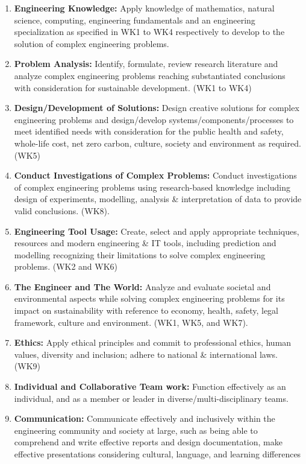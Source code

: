 \vspace{0.05cm}
\noindent
\fontsize{10pt}{24pt}\selectfont 
\begin{enumerate}
    \item \textbf{Engineering Knowledge:} Apply knowledge of mathematics, natural science, computing, engineering fundamentals and an engineering specialization as specified in WK1 to WK4 respectively to develop to the solution of complex engineering problems.
    \item \textbf{Problem Analysis:} Identify, formulate, review research literature and analyze complex engineering problems reaching substantiated conclusions with consideration for sustainable development. (WK1 to WK4)
    \item \textbf{Design/Development of Solutions:} Design creative solutions for complex engineering problems and design/develop systems/components/processes to meet identified needs with consideration for the public health and safety, whole-life cost, net zero carbon, culture, society and environment as required. (WK5)
    \item \textbf{Conduct Investigations of Complex Problems:} Conduct investigations of complex engineering problems using research-based knowledge including design of experiments, modelling, analysis \& interpretation of data to provide valid conclusions. (WK8).
    \item \textbf{Engineering Tool Usage:} Create, select and apply appropriate techniques, resources and modern engineering \& IT tools, including prediction and modelling recognizing their limitations to solve complex engineering problems. (WK2 and WK6)
    \item \textbf{The Engineer and The World:} Analyze and evaluate societal and environmental aspects while solving complex engineering problems for its impact on sustainability with reference to economy, health, safety, legal framework, culture and environment. (WK1, WK5, and WK7).
    \item \textbf{Ethics:} Apply ethical principles and commit to professional ethics, human values, diversity and inclusion; adhere to national \& international laws. (WK9)
    \item \textbf{Individual and Collaborative Team work:} Function effectively as an individual, and as a member or leader in diverse/multi-disciplinary teams.
    \item \textbf{Communication:} Communicate effectively and inclusively within the engineering community and society at large, such as being able to comprehend and write effective reports and design documentation, make effective presentations considering cultural, language, and learning differences

\end{enumerate}
